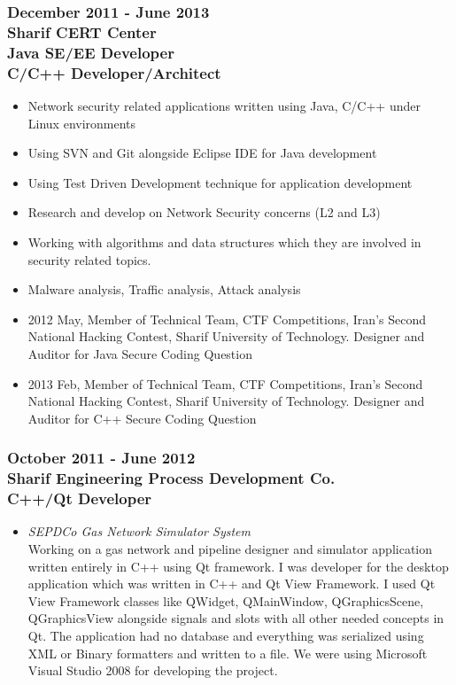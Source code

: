 \documentclass[10pt,a4paper]{article}
\begin{document}
\subsubsection{\textnormal {December 2011 - June 2013} \\ \textnormal {Sharif CERT Center} \\ Java SE/EE Developer \\ C/C++ Developer/Architect}
  \setlength{\leftskip}{0.5cm}
  \setlength{\rightskip}{1cm}
	\begin{itemize}
		\setlength{\rightskip}{2cm}
    \setlength\itemsep{0em}
	  \item \small Network security related applications written using Java, C/C++ under Linux environments
		\item \small Using SVN and Git alongside Eclipse IDE for Java development
		\item \small Using Test Driven Development technique for application development
		\item \small Research and develop on Network Security concerns (L2 and L3)
		\item \small Working with algorithms and data structures which they are involved in security related topics.
		\item \small Malware analysis, Traffic analysis, Attack analysis
		\item \small 2012 May, Member of Technical Team, CTF Competitions, Iran's Second National Hacking Contest, Sharif University of Technology. Designer and Auditor for Java Secure Coding Question
		\item \small 2013 Feb, Member of Technical Team, CTF Competitions, Iran's Second National Hacking Contest, Sharif University of Technology. Designer and Auditor for C++ Secure Coding Question
	\end{itemize}
  \setlength{\leftskip}{0pt}
  \setlength{\rightskip}{0cm}
	  
\subsubsection{\textnormal {October 2011 - June 2012} \\ \textnormal {Sharif Engineering Process Development Co.} \\ C++/Qt Developer}
  \setlength{\leftskip}{0.5cm}
  \setlength{\rightskip}{1cm}
  \begin{itemize}
		\item \small \textit{SEPDCo Gas Network Simulator System} \\
     Working on a gas network and pipeline designer and simulator application written entirely in C++ using Qt framework. I was developer for the desktop application which was written in C++ and Qt View Framework. I used Qt View Framework classes like QWidget, QMainWindow, QGraphicsScene, QGraphicsView alongside signals and slots with all other needed concepts in Qt. The application had no database and everything was serialized using XML or Binary formatters and written to a file. We were using Microsoft Visual Studio 2008 for developing the project.
  \end{itemize}
  \setlength{\leftskip}{0pt}
  \setlength{\rightskip}{0cm}
  
\end{document}

